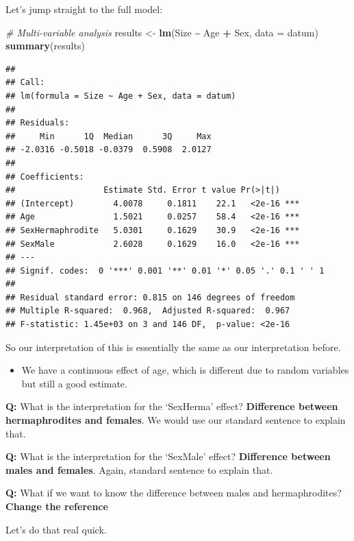 \documentclass[
]{article}
\newenvironment{Shaded}{\begin{snugshade}}{\end{snugshade}}
\newcommand{\AttributeTok}[1]{\textcolor[rgb]{0.13,0.29,0.53}{#1}}
\newcommand{\CommentTok}[1]{\textcolor[rgb]{0.56,0.35,0.01}{\textit{#1}}}
\newcommand{\FunctionTok}[1]{\textcolor[rgb]{0.13,0.29,0.53}{\textbf{#1}}}
\newcommand{\NormalTok}[1]{#1}
\newcommand{\OtherTok}[1]{\textcolor[rgb]{0.56,0.35,0.01}{#1}}
\newcommand{\SpecialCharTok}[1]{\textcolor[rgb]{0.81,0.36,0.00}{\textbf{#1}}}
\providecommand{\tightlist}{%
  \setlength{\itemsep}{0pt}\setlength{\parskip}{0pt}}
\begin{document}
Let's jump straight to the full model:

\begin{Shaded}
\begin{Highlighting}[]
\CommentTok{\# Multi{-}variable analysis}
\NormalTok{results }\OtherTok{\textless{}{-}} \FunctionTok{lm}\NormalTok{(Size }\SpecialCharTok{\textasciitilde{}}\NormalTok{ Age }\SpecialCharTok{+}\NormalTok{ Sex, }\AttributeTok{data =}\NormalTok{ datum)}
\FunctionTok{summary}\NormalTok{(results)}
\end{Highlighting}
\end{Shaded}

\begin{verbatim}
## 
## Call:
## lm(formula = Size ~ Age + Sex, data = datum)
## 
## Residuals:
##     Min      1Q  Median      3Q     Max 
## -2.0316 -0.5018 -0.0379  0.5908  2.0127 
## 
## Coefficients:
##                  Estimate Std. Error t value Pr(>|t|)    
## (Intercept)        4.0078     0.1811    22.1   <2e-16 ***
## Age                1.5021     0.0257    58.4   <2e-16 ***
## SexHermaphrodite   5.0301     0.1629    30.9   <2e-16 ***
## SexMale            2.6028     0.1629    16.0   <2e-16 ***
## ---
## Signif. codes:  0 '***' 0.001 '**' 0.01 '*' 0.05 '.' 0.1 ' ' 1
## 
## Residual standard error: 0.815 on 146 degrees of freedom
## Multiple R-squared:  0.968,  Adjusted R-squared:  0.967 
## F-statistic: 1.45e+03 on 3 and 146 DF,  p-value: <2e-16
\end{verbatim}

So our interpretation of this is essentially the same as our
interpretation before.

\begin{itemize}
\tightlist
\item
  We have a continuous effect of age, which is different due to random
  variables but still a good estimate.
\end{itemize}

\textbf{Q:} What is the interpretation for the `SexHerma' effect?
\textbf{Difference between hermaphrodites and females}. We would use our
standard sentence to explain that.

\textbf{Q:} What is the interpretation for the `SexMale' effect?
\textbf{Difference between males and females}. Again, standard sentence
to explain that.

\textbf{Q:} What if we want to know the difference between males and
hermaphrodites? \textbf{Change the reference}

Let's do that real quick.
\end{document}
